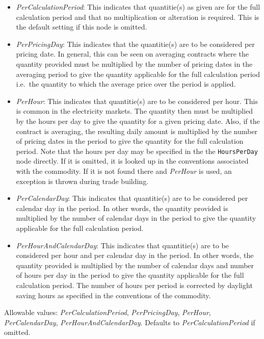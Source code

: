 \begin{itemize}
    \begin{itemize}
    \item \emph{PerCalculationPeriod}: This indicates that quantitie(s) as given are for the full calculation period and that no multiplication or alteration is required. This is the default setting if this node is omitted.
    \item  \emph{PerPricingDay}: This indicates that the quantitie(s) are to be considered per pricing date. In general, this can be seen on averaging contracts where the quantity provided must be multiplied by the number of pricing dates in the averaging period to give the quantity applicable for the full calculation period i.e.\ the quantity to which the average price over the period is applied.
    \item \emph{PerHour}: This indicates that quantitie(s) are to be considered per hour. This is common in the electricity markets. The quantity then must be multiplied by the hours per day to give the quantity for a given pricing date. Also, if the contract is averaging, the resulting daily amount is multiplied by the number of pricing dates in the period to give the quantity for the full calculation period. Note that the hours per day may be specified in the the \lstinline!HoursPerDay! node directly. If it is omitted, it is looked up in the conventions associated with the commodity. If it is not found there and \emph{PerHour} is used, an exception is thrown during trade building.
    \item \emph{PerCalendarDay}: This indicates that quantitie(s) are to be considered per calendar day in the period. In other words, the quantity provided is multiplied by the number of calendar days in the period to give the quantity applicable for the full calculation period. 
    \item \emph{PerHourAndCalendarDay}: This indicates that quantitie(s) are to be considered per hour and per calendar day in the period. In other words, the quantity provided is multiplied by the number of calendar days and number of hours per day in the period to give the quantity applicable for the full calculation period. The number of hours per period is corrected by daylight saving hours as specified in the conventions of the commodity.
    \end{itemize}

Allowable values: \emph{PerCalculationPeriod}, \emph{PerPricingDay}, \emph{PerHour}, \emph{PerCalendarDay}, \emph{PerHourAndCalendarDay}. Defaults to \emph{PerCalculationPeriod} if omitted.


\end{itemize}

